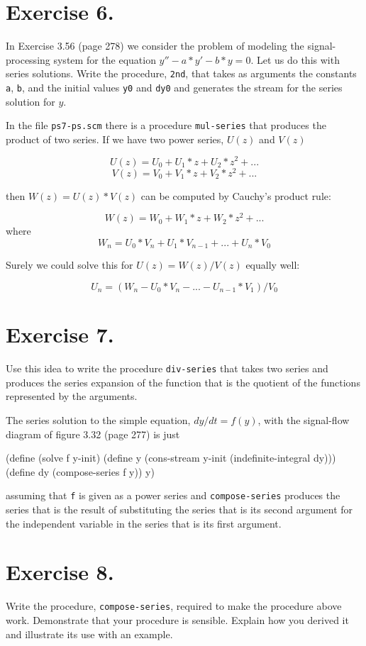 \section{Exercise 6.}
In Exercise 3.56 (page 278) we consider the problem of modeling
the signal-processing system for the equation $y''-a*y'-b*y=0$.  Let us
do this with series solutions.  Write the procedure, {\tt 2nd}, that takes
as arguments the constants {\tt a}, {\tt b}, and the initial values {\tt y0} 
and {\tt dy0} and
generates the stream for the series solution for $y$.


In the file {\tt ps7-ps.scm} there is a procedure {\tt mul-series}
that produces the
product of two series.  If we have two power series, $U(z)$ and $V(z)$

$$U(z) = U_0 + U_1*z + U_2*z^2 + ...$$
$$V(z) = V_0 + V_1*z + V_2*z^2 + ...$$

\vpar
then $W(z) = U(z)*V(z)$ can be computed by Cauchy's product rule:

$$W(z) = W_0 + W_1*z + W_2*z^2 + ...$$
where
$$W_n = U_0*V_n + U_1*V_{n-1} + ... + U_n*V_0$$

Surely we could solve this for $U(z) = W(z)/V(z)$ equally well:

$$U_n = ( W_n - U_0*V_n - ... - U_{n-1}*V_1 )/V_0$$

\section{Exercise 7.}
Use this idea to write the procedure {\tt div-series} that takes two
series and produces the series expansion of the function that is the
quotient of the functions represented by the arguments.


The series solution to the simple equation, $dy/dt=f(y)$, with the
signal-flow diagram of figure 3.32 (page 277) is just

\beginlisp
(define (solve f y-init)
  (define y (cons-stream y-init (indefinite-integral dy)))
  (define dy (compose-series f y))
  y)
\endlisp

\vpar
assuming that {\tt f} is given as a power series and {\tt compose-series}
produces
the series that is the result of substituting the series that is its
second argument for the independent variable in the series that is its
first argument.

\section{Exercise 8.}
Write the procedure, {\tt compose-series}, required to make the
procedure above work.  Demonstrate that your procedure is sensible.
Explain how you derived it and illustrate its use with an example.


